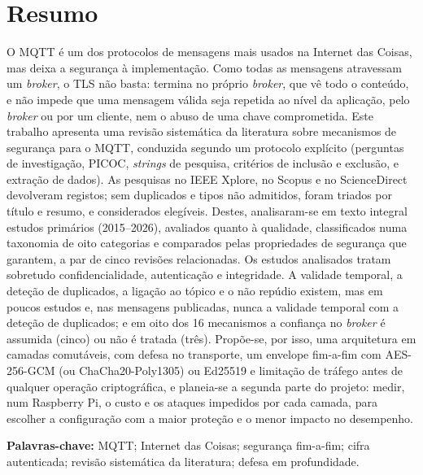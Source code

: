 \section*{Resumo}

O MQTT é um dos protocolos de mensagens mais usados na Internet das Coisas, mas deixa a
segurança à implementação. Como todas as mensagens atravessam um \emph{broker}, o
TLS não basta: termina no próprio \emph{broker}, que vê todo o conteúdo, e não
impede que uma mensagem válida seja repetida ao nível da aplicação, pelo
\emph{broker} ou por um cliente, nem o abuso de uma chave comprometida. Este trabalho
apresenta uma revisão sistemática da literatura sobre mecanismos de segurança para
o MQTT, conduzida segundo um protocolo explícito (perguntas de investigação, PICOC,
\emph{strings} de pesquisa, critérios de inclusão e exclusão, e extração de
dados). As pesquisas no IEEE Xplore, no Scopus e no ScienceDirect devolveram
\nTotalIdentificados{} registos; sem duplicados e tipos não admitidos, \nTriados{}
foram triados por título e resumo, e \nElegiveis{} considerados elegíveis. Destes, analisaram-se em texto integral
\nIncluidos{} estudos primários (2015--2026), avaliados quanto à
qualidade, classificados numa taxonomia de oito categorias e comparados pelas
propriedades de segurança que garantem, a par de cinco revisões relacionadas. Os
estudos analisados tratam sobretudo confidencialidade, autenticação e integridade.
A validade temporal, a deteção de duplicados, a ligação ao tópico e o não repúdio
existem, mas em poucos estudos e, nas mensagens publicadas, nunca a validade
temporal com a deteção de duplicados; e em oito dos 16 mecanismos a confiança no
\emph{broker} é assumida (cinco) ou não é tratada (três). Propõe-se, por isso, uma
arquitetura em
camadas comutáveis, com defesa no transporte, um envelope fim-a-fim com AES-256-GCM
(ou ChaCha20-Poly1305) ou Ed25519 e limitação de tráfego antes de qualquer operação criptográfica, e
planeia-se a segunda parte do projeto: medir, num Raspberry Pi, o custo e os
ataques impedidos por cada camada, para escolher a configuração com a maior
proteção e o menor impacto no desempenho.

\vspace{0.6cm}
\noindent\textbf{Palavras-chave:} MQTT; Internet das Coisas; segurança fim-a-fim;
cifra autenticada; revisão sistemática da literatura; defesa em profundidade.
